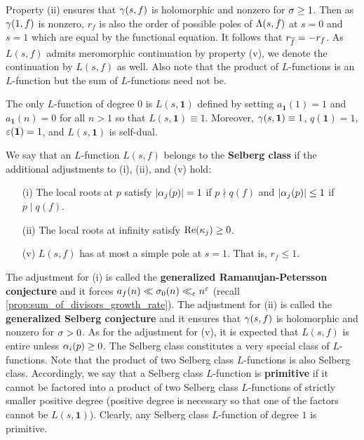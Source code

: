     Property (ii) ensures that $\gamma(s,f)$ is holomorphic and nonzero for $\sigma \ge 1$. Then as $\gamma(1,f)$ is nonzero, $r_{f}$ is also the order of possible poles of $\Lambda(s,f)$ at $s = 0$ and $s = 1$ which are equal by the functional equation. It follows that $r_{\overline{f}} = -r_{f}$. As $L(s,f)$ admits meromorphic continuation by property (v), we denote the continuation by $L(s,f)$ as well. Also note that the product of $L$-functions is an $L$-function but the sum of $L$-functions need not be.

    \begin{remark}\label{rem:degree_0_L-function}
      The only $L$-function of degree $0$ is $L(s,\mathbf{1})$ defined by setting $a_{\mathbf{1}}(1) = 1$ and $a_{\mathbf{1}}(n) = 0$ for all $n > 1$ so that $L(s,\mathbf{1}) \equiv 1$. Moreover, $\gamma(s,\mathbf{1}) \equiv 1$, $q(\mathbf{1}) = 1$, $\varepsilon(\mathbf{1}) = 1$, and $L(s,\mathbf{1})$ is self-dual.
    \end{remark}

    We say that an $L$-function $L(s,f)$ belongs to the \textbf{Selberg class} if the additional adjustments to (i), (ii), and (v) hold:
    \begin{itemize}
      \item[(i)] The local roots at $p$ satisfy $|\alpha_{j}(p)| = 1$ if $p \nmid q(f)$ and $|\alpha_{j}(p)| \le 1$ if $p \mid q(f)$.
      \item[(ii)] The local roots at infinity satisfy $\mathrm{Re}(\kappa_{j}) \ge 0$.
      \item[(v)] $L(s,f)$ has at most a simple pole at $s = 1$. That is, $r_{f} \le 1$.
    \end{itemize}
    The adjustment for (i) is called the \textbf{generalized Ramanujan-Petersson conjecture} and it forces $a_{f}(n) \ll \sigma_{0}(n) \ll_{\varepsilon} n^{\varepsilon}$ (recall \cref{prop:sum_of_divisors_growth_rate}). The adjustment for (ii) is called the \textbf{generalized Selberg conjecture} and it ensures that $\gamma(s,f)$ is holomorphic and nonzero for $\sigma > 0$. As for the adjustment for (v), it is expected that $L(s,f)$ is entire unless $\alpha_{i}(p) \ge 0$. The Selberg class constitutes a very special class of $L$-functions. Note that the product of two Selberg class $L$-functions is also Selberg class. Accordingly, we say that a Selberg class $L$-function is \textbf{primitive} if it cannot be factored into a product of two Selberg class $L$-functions of strictly smaller positive degree (positive degree is necessary so that one of the factors cannot be $L(s,\mathbf{1})$). Clearly, any Selberg class $L$-function of degree $1$ is primitive.

